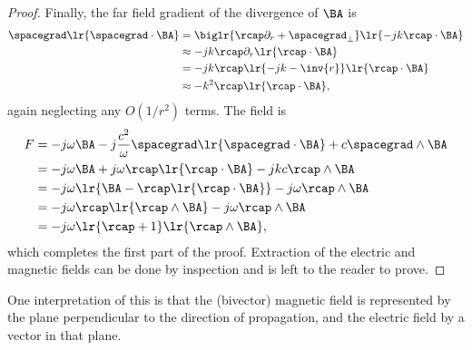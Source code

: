 \begin{proof}
Finally, the far field gradient of the divergence of \( \BA \) is
\begin{equation}\label{eqn:potentialSection_farfield:2480}
\begin{aligned}
\spacegrad \lr{ \spacegrad \cdot \BA }
&=
\biglr{ \rcap \partial_r + \spacegrad_\perp } \lr{ - j k \rcap \cdot \BA } \\
&\approx
-j k \rcap \partial_r \lr{ \rcap \cdot \BA } \\
&=
-j k \rcap \lr{ -j k - \inv{r} } \lr{ \rcap \cdot \BA } \\
&\approx
-k^2 \rcap \lr{ \rcap \cdot \BA },
\end{aligned}
\end{equation}
again neglecting any \( O(1/r^2) \) terms.  The field is
\begin{equation}\label{eqn:potentialSection_farfield:2500}
\begin{aligned}
F
&= - j \omega \BA  -j \frac{c^2}{\omega} \spacegrad \lr{ \spacegrad \cdot \BA } + c \spacegrad \wedge \BA \\
&= - j \omega \BA  +j \omega \rcap \lr{ \rcap \cdot \BA } - j k c \rcap \wedge \BA \\
&= - j \omega \lr{ \BA - \rcap \lr{ \rcap \cdot \BA }} - j \omega \rcap \wedge \BA \\
&= -j \omega \rcap \lr{ \rcap \wedge \BA} - j \omega \rcap \wedge \BA \\
&= -j \omega \lr{ \rcap + 1 } \lr{ \rcap \wedge \BA},
\end{aligned}
\end{equation}
which completes the first part of the proof.  Extraction of the electric and magnetic fields can be done by inspection and is left to the reader to prove.
\end{proof}

One interpretation of this is that the (bivector) magnetic field is represented by the plane perpendicular to the direction of propagation, and the electric field by a vector in that plane.

